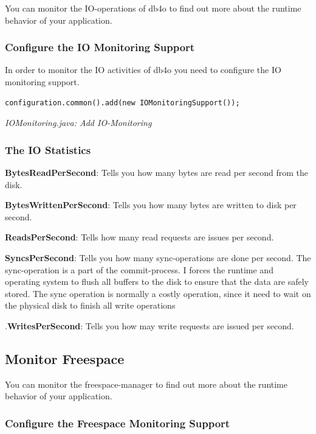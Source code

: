 You can monitor the IO-operations of db4o to find out more about the runtime behavior of your application.

\subsubsection*{Configure the IO Monitoring Support}

In order to monitor the IO activities of db4o you need to configure the IO monitoring support.

\begin{lstlisting}
configuration.common().add(new IOMonitoringSupport());
\end{lstlisting}

{\small\itshape IOMonitoring.java: Add IO-Monitoring\par}
\medskip

\subsubsection*{The IO Statistics}

\textbf{BytesReadPerSecond}: Tells you how many bytes are read per second from the disk.

\textbf{BytesWrittenPerSecond}: Tells you how many bytes are written to disk per second.

\textbf{ReadsPerSecond}: Tells how many read requests are issues per second.

\textbf{SyncsPerSecond}: Tells you how many sync-operations are done per second. The sync-operation is a part of the commit-process. I forces the runtime and operating system to flush all buffers to the disk to ensure that the data are safely stored. The sync operation is normally a costly operation, since it need to wait on the physical disk to finish all write operations

.\textbf{WritesPerSecond}: Tells you how may write requests are issued per second.

\subsection{Monitor Freespace}
\label{ref:advanced-topics-runtime-statistics-monitor-freespace}

You can monitor the freespace-manager to find out more about the runtime behavior of your application.

\subsubsection*{Configure the Freespace Monitoring Support}

